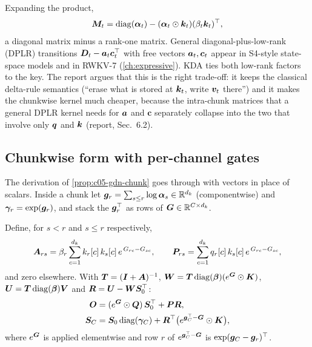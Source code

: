 Expanding the product,
\begin{equation}\label{eq:c05-kda-dplr}
  \bm{M}_t = \operatorname{diag}(\bm{\alpha}_t) - (\bm{\alpha}_t\odot\bm{k}_t)(\beta_t\bm{k}_t)^{\top} ,
\end{equation}
a diagonal matrix minus a rank-one matrix. General diagonal-plus-low-rank (DPLR) transitions
$\bm{D}_t - \bm{a}_t\bm c_t^{\top}$ with free vectors $\bm{a}_t,\bm c_t$ appear in S4-style state-space models and in
RWKV-7 (\cref{ch:expressive}). KDA ties both low-rank factors to the key. The report argues that
this is the right trade-off: it keeps the classical delta-rule semantics (``erase what is stored at
$\bm{k}_t$, write $\bm{v}_t$ there'') and it makes the chunkwise kernel much cheaper, because the
intra-chunk matrices that a general DPLR kernel needs for $\bm{a}$ and $\bm c$ separately collapse into
the two that involve only $\bm{q}$ and $\bm{k}$ (report, Sec.~6.2).

\subsection{Chunkwise form with per-channel gates}\label{sec:c05-kda-chunk}

The derivation of \cref{prop:c05-gdn-chunk} goes through with vectors in place of scalars. Inside a
chunk let $\bm{g}_r = \sum_{s\le r}\log\bm{\alpha}_s \in \mathbb{R}^{d_k}$ (componentwise) and
$\bm\gamma_r = \exp(\bm{g}_r)$, and stack the $\bm{g}_r^{\top}$ as rows of $\bm{G} \in \mathbb{R}^{C\times d_k}$.

\begin{proposition}\label{prop:c05-kda-chunk}
Define, for $s < r$ and $s \le r$ respectively,
\begin{equation}\label{eq:c05-kda-scores}
  \bm{A}_{rs} = \beta_r\sum_{c=1}^{d_k} k_r[c]\,k_s[c]\,e^{\,G_{rc} - G_{sc}},\qquad
  \bm{P}_{rs} = \sum_{c=1}^{d_k} q_r[c]\,k_s[c]\,e^{\,G_{rc} - G_{sc}},
\end{equation}
and zero elsewhere. With $\bm{T} = (\bm{I} + \bm{A})^{-1}$,
$\bm{W} = \bm{T}\operatorname{diag}(\bm{\beta})(e^{\bm{G}}\odot\bm{K})$, $\bm{U} = \bm{T}\operatorname{diag}(\bm{\beta})\bm{V}$ and
$\bm R = \bm{U} - \bm{W}\bm{S}_0^{\top}$:
\begin{align}
  \bm{O} &= (e^{\bm{G}}\odot\bm{Q})\,\bm{S}_0^{\top} + \bm{P}\bm R, \label{eq:c05-kda-out}\\
  \bm{S}_C &= \bm{S}_0\operatorname{diag}(\bm\gamma_C) + \bm R^{\top}\big(e^{\bm{g}_C^{\top} - \bm{G}}\odot\bm{K}\big), \label{eq:c05-kda-state}
\end{align}
where $e^{\bm{G}}$ is applied elementwise and row $r$ of $e^{\bm{g}_C^{\top} - \bm{G}}$ is
$\exp(\bm{g}_C - \bm{g}_r)^{\top}$.
\end{proposition}


